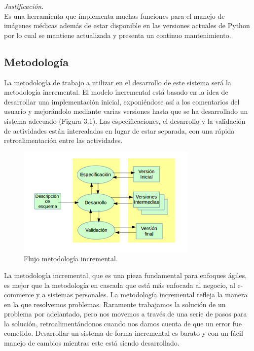\documentclass[12pt]{report}
\begin{document}
\textit{Justificación.}\\ Es una herramienta que implementa muchas funciones para el manejo de imágenes médicas además de estar disponible en las versiones actuales de Python por lo cual se mantiene actualizada y presenta un continuo mantenimiento.

\subsection{Metodología}
La metodología de trabajo a utilizar en el desarrollo de este sistema será la metodología incremental. El modelo incremental está basado en la idea de desarrollar una implementación inicial, exponiéndose así a los comentarios del usuario y mejorándolo mediante varias versiones hasta que se ha desarrollado un sistema adecuado (Figura 3.1). Las especificaciones, el desarrollo y la validación de actividades están intercaladas en lugar de estar separada, con una rápida retroalimentación entre las actividades.\cite{meto}

\begin{figure}[H]
\centering
\includegraphics[width = 12 cm, height = 7 cm]{incre}
\caption{Flujo metodología incremental.}
\end{figure}

La metodología incremental, que es una pieza fundamental para enfoques ágiles, es mejor que la metodología en cascada que está más enfocada al negocio, al e-commerce y a sistemas personales. La metodología incremental refleja la manera en la que resolvemos problemas. Raramente trabajamos la solución de un problema por adelantado, pero nos movemos a través de una serie de pasos para la solución, retroalimentándonos cuando nos damos cuenta de que un error fue cometido. Desarrollar un sistema de forma incremental es barato y con un fácil manejo de cambios mientras este está siendo desarrollado.\cite{meto}\\
\end{document}

